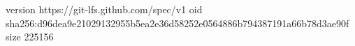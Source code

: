 version https://git-lfs.github.com/spec/v1
oid sha256:d96dea9e21029132955b5ea2e36d58252e0564886b794387191a66b78d3ae90f
size 225156
